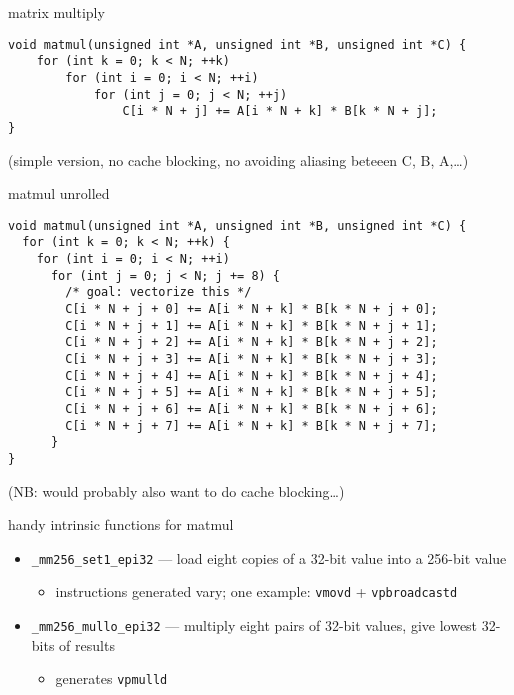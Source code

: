 
\begin{frame}[fragile,label=mmSerial]{matrix multiply}
\lstset{language=C,style=small}
\begin{lstlisting}
void matmul(unsigned int *A, unsigned int *B, unsigned int *C) {
    for (int k = 0; k < N; ++k)
        for (int i = 0; i < N; ++i)
            for (int j = 0; j < N; ++j)
                C[i * N + j] += A[i * N + k] * B[k * N + j];
}
\end{lstlisting}
(simple version, no cache blocking, no avoiding aliasing beteeen C, B, A,\ldots)
\end{frame}

\begin{frame}[fragile,label=sqSerialUnrolled]{matmul unrolled}
\lstset{language=C,style=smaller}
\begin{lstlisting}
void matmul(unsigned int *A, unsigned int *B, unsigned int *C) {
  for (int k = 0; k < N; ++k) {
    for (int i = 0; i < N; ++i)
      for (int j = 0; j < N; j += 8) {
        /* goal: vectorize this */
        C[i * N + j + 0] += A[i * N + k] * B[k * N + j + 0];
        C[i * N + j + 1] += A[i * N + k] * B[k * N + j + 1];
        C[i * N + j + 2] += A[i * N + k] * B[k * N + j + 2];
        C[i * N + j + 3] += A[i * N + k] * B[k * N + j + 3];
        C[i * N + j + 4] += A[i * N + k] * B[k * N + j + 4];
        C[i * N + j + 5] += A[i * N + k] * B[k * N + j + 5];
        C[i * N + j + 6] += A[i * N + k] * B[k * N + j + 6];
        C[i * N + j + 7] += A[i * N + k] * B[k * N + j + 7];
      }
}
\end{lstlisting}
(NB: would probably also want to do cache blocking\ldots)
\end{frame}

\begin{frame}[fragile,label=sqVectInstr]{handy intrinsic functions for matmul}
    \begin{itemize}
        \item {\tt \_mm256\_set1\_epi32} --- load eight copies of a 32-bit value into a 256-bit value
            \begin{itemize}
            \item instructions generated vary; one example: {\tt vmovd} + {\tt vpbroadcastd}
            \end{itemize}
        \item {\tt \_mm256\_mullo\_epi32} --- multiply eight pairs of 32-bit values, give lowest 32-bits of results
            \begin{itemize}
            \item generates {\tt vpmulld}
            \end{itemize}
    \end{itemize}
\end{frame}

